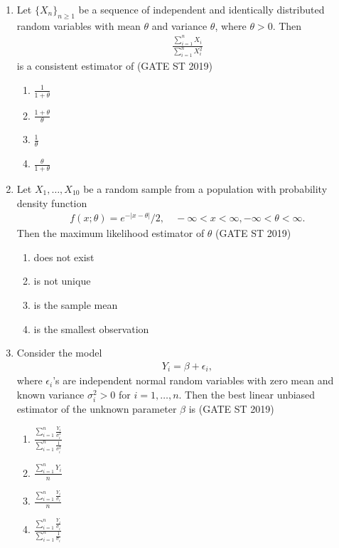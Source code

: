 \documentclass[journal]{IEEEtran}
\begin{document}
\begin{enumerate}[start=1]
\item Let \(\{X_n\}_{n\geq 1}\) be a sequence of independent and identically distributed random variables with mean \(\theta\) and variance \(\theta\), where \(\theta > 0\). Then
\begin{align*}
\frac{\sum_{i=1}^n X_i}{\sum_{i=1}^n X_i^2}
\end{align*}
is a consistent estimator of \hfill(GATE ST 2019)
\begin{multicols}{4}
\begin{enumerate}
\item \(\frac{1}{1+\theta}\)
\item \(\frac{1+\theta}{\theta}\)
\item \(\frac{1}{\theta}\)
\item \(\frac{\theta}{1+\theta}\)
\end{enumerate}
\end{multicols}

\item Let \(X_1, \ldots, X_{10}\) be a random sample from a population with probability density function
\begin{align*}
f(x;\theta) = e^{-|x - \theta|}/2, \quad -\infty < x < \infty, -\infty < \theta < \infty.
\end{align*}
Then the maximum likelihood estimator of \(\theta\) \hfill(GATE ST 2019)
\begin{enumerate}
\item does not exist
\item is not unique
\item is the sample mean
\item is the smallest observation
\end{enumerate}

\item Consider the model
\begin{align*}
Y_i = \beta + \epsilon_i,
\end{align*}
where \(\epsilon_i\)'s are independent normal random variables with zero mean and known variance \(\sigma_i^2 > 0\) for \(i=1, \ldots, n\). Then the best linear unbiased estimator of the unknown parameter \(\beta\) is \hfill(GATE ST 2019)
\begin{multicols}{4}
\begin{enumerate}
\item \(\frac{\sum_{i=1}^n \frac{Y_i}{\sigma_i^2}}{\sum_{i=1}^n \frac{1}{\sigma_i^2}}\)
\item \(\frac{\sum_{i=1}^n Y_i}{n}\)
\item \(\frac{\sum_{i=1}^n \frac{Y_i}{\sigma_i}}{n}\)
\item \(\frac{\sum_{i=1}^n \frac{Y_i}{\sigma_i}}{\sum_{i=1}^n \frac{1}{\sigma_i}}\)
\end{enumerate}
\end{multicols}


\end{enumerate}
\end{document}
